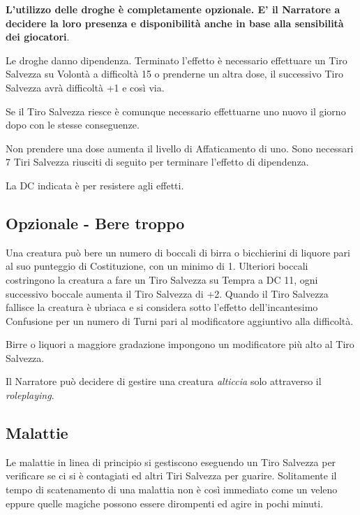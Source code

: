 \begin{multicols}{2}

\medskip

\textbf{L'utilizzo delle droghe è completamente opzionale. E' il Narratore a decidere la loro presenza e disponibilità anche in base alla sensibilità dei giocatori}.

Le droghe danno dipendenza. Terminato l'effetto è necessario effettuare un Tiro Salvezza su Volontà a difficoltà 15 o prenderne un altra dose, il successivo Tiro Salvezza avrà difficoltà +1 e così via.

Se il Tiro Salvezza riesce è comunque necessario effettuarne uno nuovo il giorno dopo con le stesse conseguenze.

Non prendere una dose aumenta il livello di Affaticamento di uno. Sono necessari 7 Tiri Salvezza riusciti di seguito per terminare l'effetto di dipendenza.

La DC indicata è per resistere agli effetti.

\subsection{Opzionale - Bere troppo}\hypertarget{alcolismo}{}\label{beretroppo}

Una creatura può bere un numero di boccali di birra o bicchierini di liquore pari al suo punteggio di Costituzione, con un minimo di 1. Ulteriori boccali costringono la creatura a fare un Tiro Salvezza su Tempra a DC 11, ogni successivo boccale aumenta il Tiro Salvezza di +2. Quando il Tiro Salvezza fallisce la creatura è ubriaca e si considera sotto l'effetto dell'incantesimo Confusione per un numero di Turni pari al modificatore aggiuntivo alla difficoltà.

Birre o liquori a maggiore gradazione impongono un modificatore più alto al Tiro Salvezza.

Il Narratore può decidere di gestire una creatura \emph{alticcia} solo attraverso il \emph{roleplaying}.

\subsection{Malattie}\hypertarget{malattie}{}\label{malattie}

Le malattie in linea di principio si gestiscono eseguendo un Tiro Salvezza per verificare se ci si è contagiati ed altri Tiri Salvezza per guarire.
Solitamente il tempo di scatenamento di una malattia non è così immediato come un veleno eppure quelle magiche possono essere dirompenti ed agire in pochi minuti.


\end{multicols}
